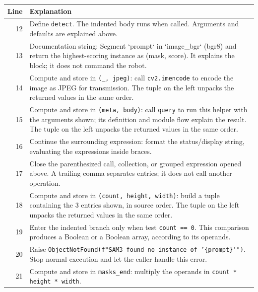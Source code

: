 \documentclass[11pt,a4paper]{book}
\begin{document}
\begin{longtable}{r p{}}

\textbf{Line} & \textbf{Explanation} \\ \hline \endhead

12 & Define \texttt{detect}. The indented body runs when called. Arguments and defaults are explained above. \\

13 & Documentation string: Segment `prompt` in `image\_bgr` (bgr8) and return the highest-scoring instance as (mask, score). It explains the block; it does not command the robot. \\

14 & Compute and store in \texttt{(\_, jpeg)}: call \texttt{cv2.imencode} to encode the image as JPEG for transmission. The tuple on the left unpacks the returned values in the same order. \\

15 & Compute and store in \texttt{(meta, body)}: call \texttt{query} to run this helper with the arguments shown; its definition and module flow explain the result. The tuple on the left unpacks the returned values in the same order. \\

16 & Continue the surrounding expression: format the status/display string, evaluating the expressions inside braces. \\

17 & Close the parenthesized call, collection, or grouped expression opened above. A trailing comma separates entries; it does not call another operation. \\

18 & Compute and store in \texttt{(count, height, width)}: build a tuple containing the 3 entries shown, in source order. The tuple on the left unpacks the returned values in the same order. \\

19 & Enter the indented branch only when test \texttt{count == 0}. This comparison produces a Boolean or a Boolean array, according to its operands. \\

20 & Raise \texttt{ObjectNotFound(f"SAM3 found no instance of '\{prompt\}'")}. Stop normal execution and let the caller handle this error. \\

21 & Compute and store in \texttt{masks\_end}: multiply the operands in \texttt{count * height * width}.  \\


\end{longtable}
\end{document}
